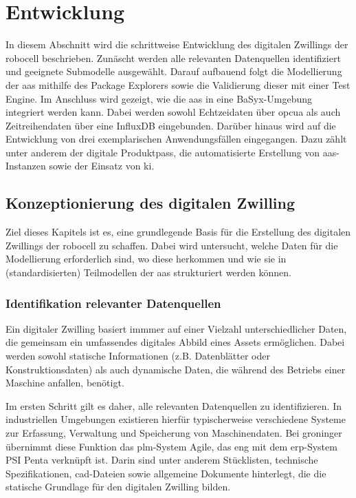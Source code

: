 \section{Entwicklung}
In diesem Abschnitt wird die schrittweise Entwicklung des digitalen Zwillings der robocell beschrieben.
Zunäscht werden alle relevanten Datenquellen identifiziert und geeignete Submodelle ausgewählt.
Darauf aufbauend folgt die Modellierung der \acs{aas} mithilfe des Package Explorers sowie die Validierung dieser mit einer Test Engine.
Im Anschluss wird gezeigt, wie die \acs{aas} in eine BaSyx-Umgebung integriert werden kann.
Dabei werden sowohl Echtzeidaten über \acs{opcua} als auch Zeitreihendaten über eine InfluxDB eingebunden.
Darüber hinaus wird auf die Entwicklung von drei exemplarischen Anwendungsfällen eingegangen.
Dazu zählt unter anderem der digitale Produktpass, die automatisierte Erstellung von \acs{aas}-Instanzen sowie der Einsatz von \acs{ki}.

\subsection{Konzeptionierung des digitalen Zwilling}
Ziel dieses Kapitels ist es, eine grundlegende Basis für die Erstellung des digitalen Zwillings der robocell zu schaffen.
Dabei wird untersucht, welche Daten für die Modellierung erforderlich sind, wo diese herkommen und wie sie in (standardisierten) Teilmodellen der \acs{aas} strukturiert werden können.
\subsubsection{Identifikation relevanter Datenquellen}
Ein digitaler Zwilling basiert immmer auf einer Vielzahl unterschiedlicher Daten, die gemeinsam ein umfassendes digitales Abbild eines Assets ermöglichen. 
Dabei werden sowohl statische Informationen (z.B. Datenblätter oder Konstruktionsdaten) als auch dynamische Daten, die während des Betriebs einer Maschine anfallen, benötigt.

Im ersten Schritt gilt es daher, alle relevanten Datenquellen zu identifizieren.
In industriellen Umgebungen existieren hierfür typischerweise verschiedene Systeme zur Erfassung, Verwaltung und Speicherung von Maschinendaten.
Bei groninger übernimmt diese Funktion das \acs{plm}-System Agile, das eng mit dem \acs{erp}-System PSI Penta verknüpft ist.
Darin sind unter anderem Stücklisten, technische Spezifikationen, \acs{cad}-Dateien sowie allgemeine Dokumente hinterlegt, die die statische Grundlage  für den digitalen Zwilling bilden.

